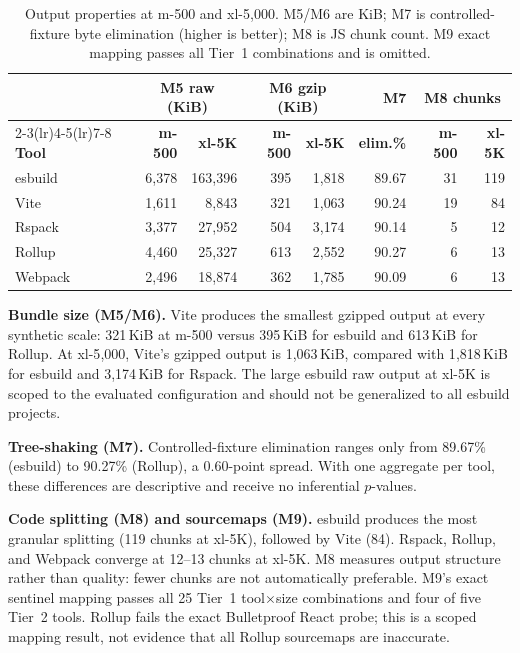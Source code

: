 \documentclass[preprint,12pt]{elsarticle}
\begin{document}
\begin{table}[htbp]
\centering
\caption{Output properties at m-500 and xl-5{,}000. M5/M6 are KiB; M7 is controlled-fixture byte elimination (higher is better); M8 is JS chunk count. M9 exact mapping passes all Tier~1 combinations and is omitted.}\label{tab:quality}
\begin{tabular}{@{}lrrrrrrr@{}}
\toprule
 & \multicolumn{2}{c}{\textbf{M5 raw (KiB)}} & \multicolumn{2}{c}{\textbf{M6 gzip (KiB)}} & \textbf{M7} & \multicolumn{2}{c}{\textbf{M8 chunks}} \\
\cmidrule(lr){2-3}\cmidrule(lr){4-5}\cmidrule(lr){7-8}
\textbf{Tool} & \textbf{m-500} & \textbf{xl-5K} & \textbf{m-500} & \textbf{xl-5K} & \textbf{elim.\%} & \textbf{m-500} & \textbf{xl-5K} \\
\midrule
esbuild & 6{,}378 & 163{,}396 & 395 & 1{,}818 & 89.67 & 31 & 119 \\
Vite    & 1{,}611 &   8{,}843 & 321 & 1{,}063 & 90.24 & 19 &  84 \\
Rspack  & 3{,}377 &  27{,}952 & 504 & 3{,}174 & 90.14 &  5 &  12 \\
Rollup  & 4{,}460 &  25{,}327 & 613 & 2{,}552 & 90.27 &  6 &  13 \\
Webpack & 2{,}496 &  18{,}874 & 362 & 1{,}785 & 90.09 &  6 &  13 \\
\bottomrule
\end{tabular}
\end{table}

\textbf{Bundle size (M5/M6).}
Vite produces the smallest gzipped output at every synthetic scale: 321\,KiB at m-500 versus 395\,KiB for esbuild and 613\,KiB for Rollup.
At xl-5{,}000, Vite's gzipped output is 1{,}063\,KiB, compared with 1{,}818\,KiB for esbuild and 3{,}174\,KiB for Rspack.
The large esbuild raw output at xl-5K is scoped to the evaluated configuration and should not be generalized to all esbuild projects.

\textbf{Tree-shaking (M7).}
Controlled-fixture elimination ranges only from 89.67\% (esbuild) to 90.27\% (Rollup), a 0.60-point spread.
With one aggregate per tool, these differences are descriptive and receive no inferential $p$-values.

\textbf{Code splitting (M8) and sourcemaps (M9).}
esbuild produces the most granular splitting (119 chunks at xl-5K), followed by Vite (84).
Rspack, Rollup, and Webpack converge at 12--13 chunks at xl-5K.
M8 measures output structure rather than quality: fewer chunks are not automatically preferable.
M9's exact sentinel mapping passes all 25 Tier~1 tool$\times$size combinations and four of five Tier~2 tools.
Rollup fails the exact Bulletproof React probe; this is a scoped mapping result, not evidence that all Rollup sourcemaps are inaccurate.
\end{document}
